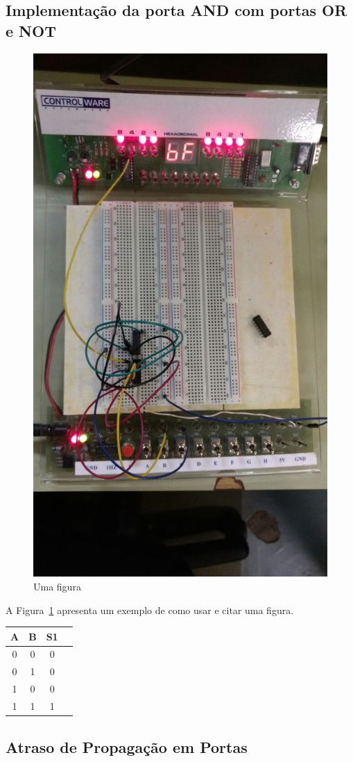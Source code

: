 \documentclass[12pt]{article}
\begin{document}
\subsection{Implementação da porta AND com portas OR e NOT}
\label{sec:NOTOR}

\begin{figure}[H]
\centering
\includegraphics[width=.5\textwidth]{Porta_AND.jpeg}
\caption{Uma figura}
\label{fig:portaand}
\end{figure}

A Figura~\ref{fig:portaand} apresenta um exemplo de como usar e citar uma figura.

\begin{table}
	\centering
	\begin{tabular}{|c|c|c|c|}
	\cline{1-4}
	\multicolumn{1}{|c|}{A} & \multicolumn{1}{|c|}{B} & \multicolumn{1}{|c|}{S1}\\
	\hline
	0 & 0 & 0\\
	0 & 1 & 0\\
	1 & 0 & 0\\
	1 & 1 & 1\\
	\hline
	\end{tabular}
	\label{Porta OR}
\end{table}

\subsection{Atraso de Propagação em Portas}
\label{sec:atraso}
\end{document}
